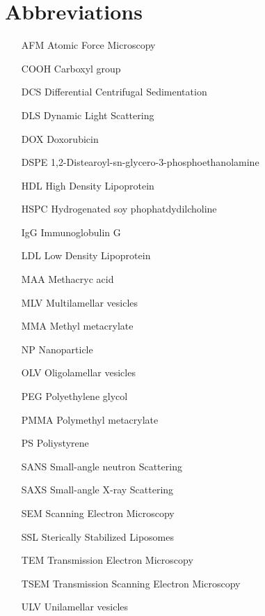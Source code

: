 \section*{Abbreviations}

\begin{itemize}
        \item   [AFM] Atomic Force Microscopy
        \item   [COOH] Carboxyl group
        \item   [DCS] Differential Centrifugal Sedimentation
        \item   [DLS] Dynamic Light Scattering
        \item   [DOX] Doxorubicin        
        \item   [DSPE] 1,2-Distearoyl-sn-glycero-3-phosphoethanolamine
        \item   [HDL] High Density Lipoprotein
        \item   [HSPC] Hydrogenated soy phophatdydilcholine
        \item   [IgG] Immunoglobulin G
        \item   [LDL] Low Density Lipoprotein
        \item   [MAA] Methacryc acid
        \item   [MLV] Multilamellar vesicles
        \item   [MMA] Methyl metacrylate        
        \item   [NP] Nanoparticle
        \item   [OLV] Oligolamellar vesicles
        \item   [PEG] Polyethylene glycol
        \item   [PMMA] Polymethyl metacrylate
        \item   [PS] Poliystyrene
        \item   [SANS] Small-angle neutron Scattering
        \item   [SAXS] Small-angle X-ray Scattering
        \item   [SEM] Scanning Electron Microscopy
        \item   [SSL] Sterically Stabilized Liposomes
        \item   [TEM] Transmission Electron Microscopy
        \item   [TSEM] Transmission Scanning Electron Microscopy
        \item   [ULV] Unilamellar vesicles

        

\end{itemize}

\cleardoublepage
